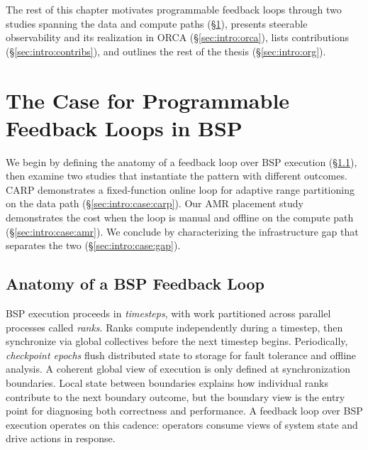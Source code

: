 
The rest of this chapter motivates programmable feedback loops through two studies
spanning the data and compute paths (\S\ref{sec:intro:case}), presents steerable observability and
its realization in ORCA (\S\ref{sec:intro:orca}), lists contributions (\S\ref{sec:intro:contribs}),
and outlines the rest of the thesis (\S\ref{sec:intro:org}).

\section{The Case for Programmable Feedback Loops in BSP}
\label{sec:intro:case}

We begin by defining the anatomy of a feedback loop over BSP execution
(\S\ref{sec:intro:case:anatomy}), then examine
two studies that instantiate the pattern with different outcomes.
CARP demonstrates a fixed-function
online loop for adaptive range partitioning on the data path (\S\ref{sec:intro:case:carp}).
Our AMR placement study
demonstrates the cost when the loop is manual and offline on the compute path
(\S\ref{sec:intro:case:amr}).
We
conclude by characterizing the infrastructure gap that separates the two
(\S\ref{sec:intro:case:gap}).

\subsection{Anatomy of a BSP Feedback Loop}
\label{sec:intro:case:anatomy}

BSP execution proceeds in \emph{timesteps}, with work partitioned across parallel processes called
\emph{ranks}.
Ranks compute independently during a timestep, then synchronize via global collectives before
the next timestep begins.
Periodically, \emph{checkpoint epochs} flush distributed state to storage for fault tolerance and
offline analysis.
A coherent global view of execution is only defined at synchronization boundaries.
Local state between boundaries explains how individual ranks contribute to the next boundary
outcome, but the boundary view is the entry point for diagnosing both correctness and performance.
A feedback loop over BSP execution operates on this cadence: operators consume views of system
state and drive
actions in response.

